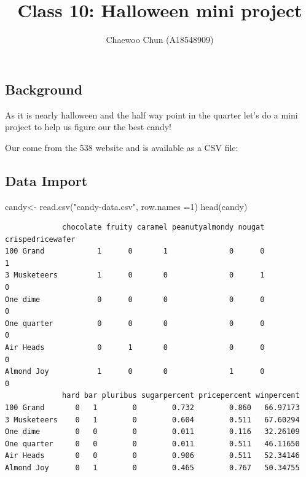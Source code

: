\documentclass[
  letterpaper,
  DIV=11,
  numbers=noendperiod]{scrartcl}
\title{Class 10: Halloween mini project}
\author{Chaewoo Chun (A18548909)}
\date{}
\newenvironment{Shaded}{\begin{snugshade}}{\end{snugshade}}
\newcommand{\AttributeTok}[1]{\textcolor[rgb]{0.40,0.45,0.13}{#1}}
\newcommand{\DecValTok}[1]{\textcolor[rgb]{0.68,0.00,0.00}{#1}}
\newcommand{\FunctionTok}[1]{\textcolor[rgb]{0.28,0.35,0.67}{#1}}
\newcommand{\NormalTok}[1]{\textcolor[rgb]{0.00,0.23,0.31}{#1}}
\newcommand{\OtherTok}[1]{\textcolor[rgb]{0.00,0.23,0.31}{#1}}
\newcommand{\StringTok}[1]{\textcolor[rgb]{0.13,0.47,0.30}{#1}}
\renewcommand*\contentsname{Table of contents}
\newcommand\contentsname{Table of contents}
\begin{document}
\maketitle

\renewcommand*\contentsname{Table of contents}
{
\hypersetup{linkcolor=}
\setcounter{tocdepth}{3}
\tableofcontents
}

\subsection{Background}\label{background}

As it is nearly halloween and the half way point in the quarter let's do
a mini project to help us figure our the best candy!

Our come from the 538 website and is available as a CSV file:

\subsection{Data Import}\label{data-import}

\begin{Shaded}
\begin{Highlighting}[]
\NormalTok{candy}\OtherTok{\textless{}{-}} \FunctionTok{read.csv}\NormalTok{(}\StringTok{"candy{-}data.csv"}\NormalTok{, }\AttributeTok{row.names =}\DecValTok{1}\NormalTok{)}
\FunctionTok{head}\NormalTok{(candy)}
\end{Highlighting}
\end{Shaded}

\begin{verbatim}
             chocolate fruity caramel peanutyalmondy nougat crispedricewafer
100 Grand            1      0       1              0      0                1
3 Musketeers         1      0       0              0      1                0
One dime             0      0       0              0      0                0
One quarter          0      0       0              0      0                0
Air Heads            0      1       0              0      0                0
Almond Joy           1      0       0              1      0                0
             hard bar pluribus sugarpercent pricepercent winpercent
100 Grand       0   1        0        0.732        0.860   66.97173
3 Musketeers    0   1        0        0.604        0.511   67.60294
One dime        0   0        0        0.011        0.116   32.26109
One quarter     0   0        0        0.011        0.511   46.11650
Air Heads       0   0        0        0.906        0.511   52.34146
Almond Joy      0   1        0        0.465        0.767   50.34755
\end{verbatim}
\end{document}
